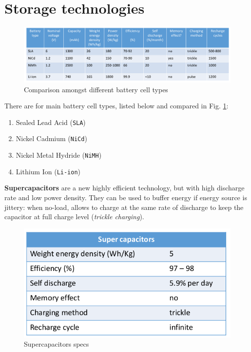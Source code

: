 \section{Storage technologies}
\begin{figure}[htbp]
   \centering
   \includegraphics{images/batterycomparison.png}
   \caption{Comparison amongst different battery cell types}
   \label{fig:batterycomparison}
\end{figure}
There are for main battery cell types, listed below and compared in Fig. \ref{fig:batterycomparison}:
\begin{enumerate}
   \item Sealed Lead Acid (\texttt{SLA})
   \item Nickel Cadmium (\texttt{NiCd})
   \item Nickel Metal Hydride (\texttt{NiMH})
   \item Lithium Ion (\texttt{Li-ion})
\end{enumerate}

\begin{paracol}{2}
   \colfill
   \textbf{Supercapacitors} are a new highly efficient technology, but with high discharge rate and low power density.
   They can be used to buffer energy if energy source is jittery: when no-load, allows to charge at the same rate of discharge to keep the capacitor at full charge level (\textit{trickle charging}). 
   \colfill
   \switchcolumn
   \begin{figure}[htbp]
      \centering
      \includegraphics{images/supercacitors.png}
      \caption{Supercapacitors specs}
      \label{fig:supercacitors}
   \end{figure}
\end{paracol}

